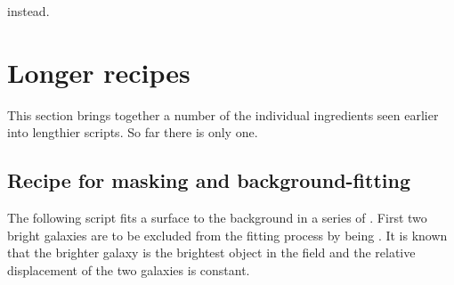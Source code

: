 \documentclass[twoside,11pt,nolof]{starlink}
\providecommand{\NDFref}[1]{\xref{#1}{sun33}{}}
\begin{document}
\begin{small}
\begin{terminalv}
\end{terminalv}
\end{small}
instead.

\newpage
\section{Longer recipes
\label{sc4_se_long_recipes}}

This section brings together a number of the individual ingredients
seen earlier into lengthier scripts.  So far there is only one.

\subsection{Recipe for masking and background-fitting
\label{sc4_se_long1}}

The following script fits a surface to the background in a series of
\NDFref{\textsf{NDF}s}.
First two bright galaxies are to be excluded from the fitting process by
being .  It is known that the brighter
galaxy is the brightest object in the field and the relative
displacement of the two galaxies is constant.
\end{document}

